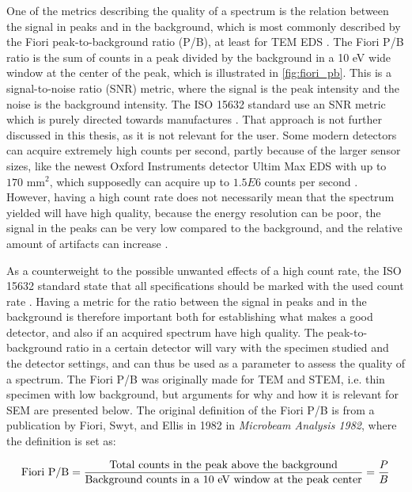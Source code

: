 One of the metrics describing the quality of a spectrum is the relation between the signal in peaks and in the background, which is most commonly described by the Fiori peak-to-background ratio (P/B), at least for TEM EDS \cite{williams_carter_tem_2009}.
The Fiori P/B ratio is the sum of counts in a peak divided by the background in a 10 eV wide window at the center of the peak, which is illustrated in \cref{fig:fiori_pb}.
This is a signal-to-noise ratio (SNR) metric, where the signal is the peak intensity and the noise is the background intensity.
The ISO 15632 standard use an SNR metric which is purely directed towards manufactures \cite{iso_qc_15632}.
That approach is not further discussed in this thesis, as it is not relevant for the user.
Some modern detectors can acquire extremely high counts per second, partly because of the larger sensor sizes, like the newest Oxford Instruments detector Ultim Max EDS with up to $170$ mm$^2$, which supposedly can acquire up to $1.5E6$ counts per second \cite{oxford_ultim_max}.
However, having a high count rate does not necessarily mean that the spectrum yielded will have high quality, because the energy resolution can be poor, the signal in the peaks can be very low compared to the background, and the relative amount of artifacts can increase \cite{iso_qc_15632}.


As a counterweight to the possible unwanted effects of a high count rate, the ISO 15632 standard state that all specifications should be marked with the used count rate \cite{iso_qc_15632}.
Having a metric for the ratio between the signal in peaks and in the background is therefore important both for establishing what makes a good detector, and also if an acquired spectrum have high quality.
The peak-to-background ratio in a certain detector will vary with the specimen studied and the detector settings, and can thus be used as a parameter to assess the quality of a spectrum.
The Fiori P/B was originally made for TEM and STEM, i.e. thin specimen with low background, but arguments for why and how it is relevant for SEM are presented below.
The original definition of the Fiori P/B is from a publication by Fiori, Swyt, and Ellis in 1982 \cite{fiori_peak_background_1982} in \emph{Microbeam Analysis 1982}, where the definition is set as:

\begin{equation}
    \label{eq:fiori_pb}
    \textnormal{Fiori P/B} = \frac{\textnormal{Total counts in the peak above the background}}{\textnormal{Background counts in a 10 eV window at the peak center}} = \frac{P}{B}
\end{equation}


